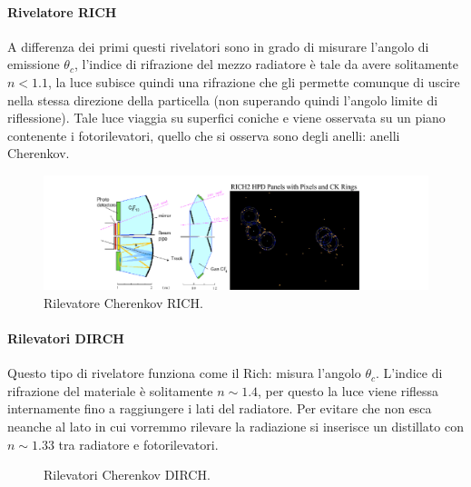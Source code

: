 \paragraph{Rivelatore RICH}%
A differenza dei primi questi rivelatori sono in grado di misurare l'angolo di emissione $\theta_{c}$, l'indice di rifrazione del mezzo radiatore è tale da avere solitamente $n < 1.1$, la luce subisce quindi una rifrazione che gli permette comunque di uscire nella stessa direzione della particella (non superando quindi l'angolo limite di riflessione). Tale luce viaggia su superfici coniche e viene osservata su un piano contenente i fotorilevatori, quello che si osserva sono degli anelli: anelli Cherenkov. 
\begin{figure}[H]
	\centering
	\includegraphics[width=1\textwidth]{immagini/RICH.png}
	\caption{Rilevatore Cherenkov RICH.}
	\label{fig:immagini-RICH-png}
\end{figure}

\paragraph{Rilevatori DIRCH}%
Questo tipo di rivelatore funziona come il Rich: misura l'angolo $\theta_{c}$. L'indice di rifrazione del materiale è solitamente $n\sim 1.4$, per questo la luce viene riflessa internamente fino a raggiungere i lati del radiatore. Per evitare che non esca neanche al lato in cui vorremmo rilevare la radiazione si inserisce un distillato con $n \sim 1.33$ tra radiatore e fotorilevatori.
\begin{figure}[ht]
    \centering
    \caption{Rilevatori Cherenkov DIRCH.}
    \label{fig:rilevatori-cherenkov-dirch}
\end{figure}

